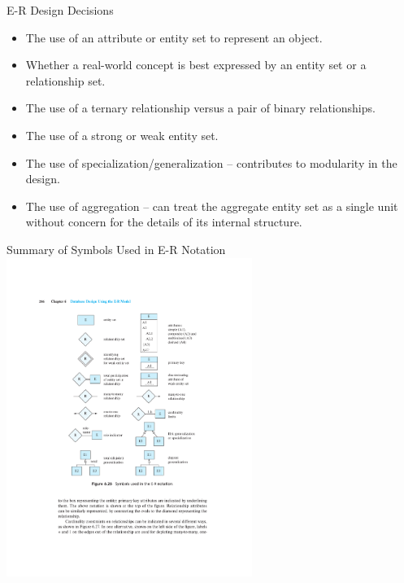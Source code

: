 \documentclass{beamer}
\begin{document}
\begin{frame}{E-R Design Decisions}
    \begin{itemize}
        \item The use of an attribute or entity set to represent an object.
        \item Whether a real-world concept is best expressed by an entity set or a relationship set.
        \item The use of a ternary relationship versus a pair of binary relationships.
        \item The use of a strong or weak entity set.
        \item The use of specialization/generalization -- contributes to modularity in the design.
        \item The use of aggregation -- can treat the aggregate entity set as a single unit without concern for the details of its internal structure.
    \end{itemize}
\end{frame}

\begin{frame}{Summary of Symbols Used in E-R Notation}
    \centering
    \includegraphics[trim={5.45cm 8.75cm 5.05cm 4.8cm}, clip, width=0.6\textwidth]{figures/symbols}
\end{frame}
\end{document}
